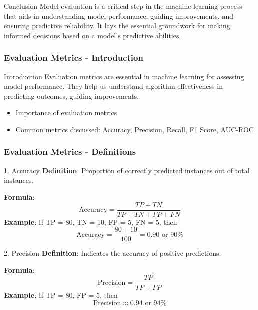 \documentclass{beamer}
\begin{document}
\begin{frame}[fragile]
    \begin{block}{Conclusion}
        Model evaluation is a critical step in the machine learning process that aids in understanding model performance, guiding improvements, and ensuring predictive reliability. It lays the essential groundwork for making informed decisions based on a model's predictive abilities.
    \end{block}
\end{frame}

\begin{frame}[fragile]
    \frametitle{Evaluation Metrics - Introduction}
    \begin{block}{Introduction}
        Evaluation metrics are essential in machine learning for assessing model performance. They help us understand algorithm effectiveness in predicting outcomes, guiding improvements.
    \end{block}
    \begin{itemize}
        \item Importance of evaluation metrics
        \item Common metrics discussed: Accuracy, Precision, Recall, F1 Score, AUC-ROC
    \end{itemize}
\end{frame}

\begin{frame}[fragile]
    \frametitle{Evaluation Metrics - Definitions}
    \begin{block}{1. Accuracy}
        \textbf{Definition}: Proportion of correctly predicted instances out of total instances.
        
        \textbf{Formula}:
        \begin{equation}
            \text{Accuracy} = \frac{TP + TN}{TP + TN + FP + FN}
        \end{equation}
        \textbf{Example}: 
        If TP = 80, TN = 10, FP = 5, FN = 5, then
        \begin{equation}
            \text{Accuracy} = \frac{80 + 10}{100} = 0.90 \text{ or } 90\%
        \end{equation}
    \end{block}
    
    \begin{block}{2. Precision}
        \textbf{Definition}: Indicates the accuracy of positive predictions.
        
        \textbf{Formula}:
        \begin{equation}
            \text{Precision} = \frac{TP}{TP + FP}
        \end{equation}
        \textbf{Example}:
        If TP = 80, FP = 5, then
        \begin{equation}
            \text{Precision} \approx 0.94 \text{ or } 94\%
        \end{equation}
    \end{block}
\end{frame}
\end{document}
